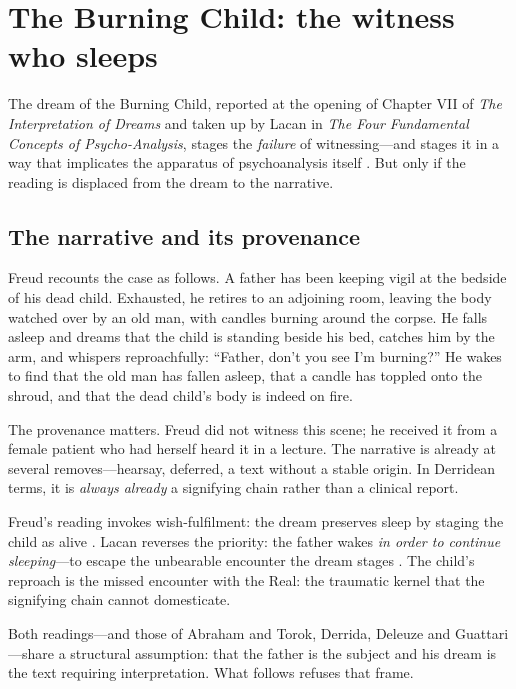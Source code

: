 \section{The Burning Child: the witness who sleeps}

The dream of the Burning Child, reported at the opening of Chapter VII of \textit{The Interpretation of Dreams} and taken up by Lacan in \textit{The Four Fundamental Concepts of Psycho-Analysis}, stages the \textit{failure} of witnessing---and stages it in a way that implicates the apparatus of psychoanalysis itself \cite{freud1900, lacan1977}.  But only if the reading is displaced from the dream to the narrative.

\subsection{The narrative and its provenance}

Freud recounts the case as follows.  A father has been keeping vigil at the bedside of his dead child.  Exhausted, he retires to an adjoining room, leaving the body watched over by an old man, with candles burning around the corpse.  He falls asleep and dreams that the child is standing beside his bed, catches him by the arm, and whispers reproachfully: ``Father, don't you see I'm burning?''  He wakes to find that the old man has fallen asleep, that a candle has toppled onto the shroud, and that the dead child's body is indeed on fire.

The provenance matters.  Freud did not witness this scene; he received it from a female patient who had herself heard it in a lecture.  The narrative is already at several removes---hearsay, deferred, a text without a stable origin.  In Derridean terms, it is \textit{always already} a signifying chain rather than a clinical report.

Freud's reading invokes wish-fulfilment: the dream preserves sleep by staging the child as alive \cite{freud1900}.  Lacan reverses the priority: the father wakes \textit{in order to continue sleeping}---to escape the unbearable encounter the dream stages \cite{lacan1977}.  The child's reproach is the missed encounter with the Real: the traumatic kernel that the signifying chain cannot domesticate.

Both readings---and those of Abraham and Torok, Derrida, Deleuze and Guattari---share a structural assumption: that the father is the subject and his dream is the text requiring interpretation.  What follows refuses that frame.

